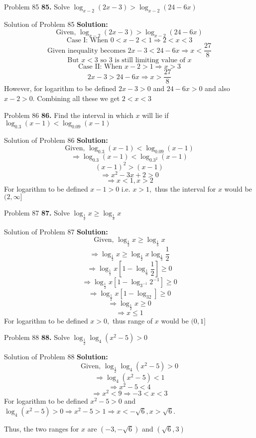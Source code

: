 \documentclass[aspectratio=169,8pt]{beamer}
\begin{document}
\begin{frame}{Problem 85}
  \textbf{85.} Solve $\log_{x - 2}(2x - 3) >\log_{x - 2}(24 - 6x)$
\end{frame}
\begin{frame}{Solution of Problem 85}
  \textbf{Solution:} $$\text{Given,~}\log_{x - 2}(2x - 3) > \log_{x - 2}(24 - 6x)$$
  $$\text{Case I: When~} 0 < x - 2 < 1 \Rightarrow 2< x < 3$$
  $$\text{Given inequality becomes~} 2x - 3 < 24 - 6x \Rightarrow x < \frac{27}{8}$$
  $$\text{But~}x < 3\text{~so~}3\text{~is still limiting value of~}x$$
  $$\text{Case II: When~}x - 2 > 1 \Rightarrow x > 3$$
  $$2x - 3 > 24 - 6x\Rightarrow x > \frac{27}{8}$$
  However, for logarithm to be defined $2x - 3 > 0$ and $24 - 6x > 0$ and also $x - 2 > 0.$ Combining all these we get $2 < x < 3$
\end{frame}
\begin{frame}{Problem 86}
  \textbf{86.} Find the interval in which $x$ will lie if $\log_{0.3}(x - 1) < \log_{0.09}(x - 1)$
\end{frame}
\begin{frame}{Solution of Problem 86}
  \textbf{Solution:} $$\text{Given,~}\log_{0.3}(x - 1) < \log_{0.09}(x - 1)$$
  $$\Rightarrow \log_{0.3}(x - 1) < \log_{0.3^2}(x - 1)$$
  $$(x - 1)^2 > (x - 1)$$
  $$\Rightarrow x^2 - 3x + 2 > 0$$
  $$\Rightarrow x < 1, x > 2$$
  For logarithm to be defined $x - 1 > 0$ i.e. $x > 1,$ thus the interval for $x$ would be $(2, \infty]$
\end{frame}
\begin{frame}{Problem 87}
  \textbf{87.} Solve $\log_{\frac{1}{2}}x \geq \log_{\frac{1}{3}}x$
\end{frame}
\begin{frame}{Solution of Problem 87}
  \textbf{Solution:} $$\text{Given,~}\log_{\frac{1}{2}}x \geq \log_{\frac{1}{3}}x$$
  $$\Rightarrow \log_{\frac{1}{2}}x \geq \log_{\frac{1}{2}}x\log_{\frac{1}{3}}\frac{1}{2}$$
  $$\Rightarrow \log_{\frac{1}{2}}x\left[1 - \log_{\frac{1}{3}}\frac{1}{2}\right]\geq 0$$
  $$\Rightarrow \log_{\frac{1}{2}}x\left[1 - \log_{3^{-1}}2^{-1}\right]\geq 0$$
  $$\Rightarrow \log_{\frac{1}{2}}x\left[1 - \log_32\right]\geq 0$$
  $$\Rightarrow \log_{\frac{1}{2}}x \geq 0$$
  $$\Rightarrow x \leq 1$$
  For logarithm to be defined $x > 0,$ thus range of $x$ would be $(0, 1]$
\end{frame}
\begin{frame}{Problem 88}
  \textbf{88.} Solve $\log_{\frac{1}{2}}\log_4(x^2 - 5) > 0$
\end{frame}
\begin{frame}{Solution of Problem 88}
  \textbf{Solution:} $$\text{Given,~}\log_{\frac{1}{2}}\log_4(x^2 - 5) > 0$$
  $$\Rightarrow \log_4(x^2 - 5) < 1$$
  $$\Rightarrow x^2 - 5 < 4$$
  $$\Rightarrow x^2 < 9 \Rightarrow -3 < x < 3$$
  For logarithm to be defined $x^2 - 5 > 0$ and $\log_4(x^2 - 5)>0 \Rightarrow x^2 - 5 > 1 \Rightarrow x < -\sqrt{6}, x > \sqrt{6}$.

  Thus, the two ranges for $x$ are $(-3, -\sqrt{6})$ and $(\sqrt{6}, 3)$
\end{frame}
\end{document}
